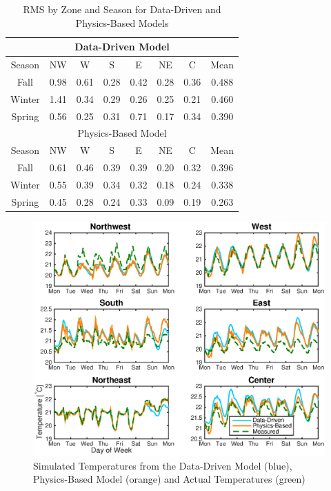\begin{table}[hbtp]
\centering
\begin{tabular}{*8c}
\toprule
\multicolumn{8}{c}{Data-Driven Model} \\
\hline
Season & NW & W & S & E & NE & C & Mean \\ \hline
Fall & 0.98 & 0.61 & 0.28 & 0.42 & 0.28 & 0.36 & 0.488\\
Winter & 1.41 & 0.34 & 0.29 & 0.26 & 0.25 & 0.21 & 0.460\\
Spring & 0.56 & 0.25 & 0.31 & 0.71 & 0.17 & 0.34 & 0.390\\
\midrule
\midrule
\multicolumn{8}{c}{Physics-Based Model} \\
\hline
Season & NW & W & S & E & NE & C & Mean \\ \hline
Fall & 0.61 & 0.46 & 0.39 & 0.39 & 0.20 & 0.32 & 0.396\\
Winter & 0.55 & 0.39 & 0.34 & 0.32 & 0.18 & 0.24 & 0.338\\
Spring & 0.45 & 0.28 & 0.24 & 0.33 & 0.09 & 0.19 & 0.263\\
\bottomrule
\end{tabular}
\caption{RMS by Zone and Season for Data-Driven and Physics-Based Models}
\label{tab:data_RMS_zones}
\end{table}



\begin{figure}
\centering
\vspace*{-0.1cm}
\includegraphics[width=\textwidth]{chapters/building_model/figures/open_loop_traj.eps}
\vspace*{-0.5cm}
\caption{Simulated Temperatures from the Data-Driven Model (blue), Physics-Based Model (orange) and Actual Temperatures (green) }
\vspace*{-0.5cm}
\label{fig:open_loop_trajectories}
\end{figure}

